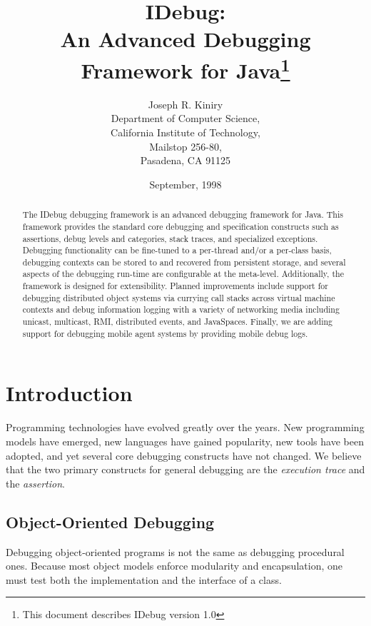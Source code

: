 \documentclass{article}
\title{IDebug:\\An Advanced Debugging Framework for Java\thanks{This
document describes IDebug version 1.0}}
\author{Joseph R. Kiniry\\
  Department of Computer Science,\\
  California Institute of Technology,\\
  Mailstop 256-80,\\
  Pasadena, CA 91125}
\date{September, 1998}
\begin{document}
\maketitle

\begin{abstract}
  
  The IDebug debugging framework is an advanced debugging framework for
  Java.  This framework provides the standard core debugging and
  specification constructs such as assertions, debug levels and categories,
  stack traces, and specialized exceptions.  Debugging functionality can be
  fine-tuned to a per-thread and/or a per-class basis, debugging contexts
  can be stored to and recovered from persistent storage, and several
  aspects of the debugging run-time are configurable at the meta-level.
  Additionally, the framework is designed for extensibility.  Planned
  improvements include support for debugging distributed object systems via
  currying call stacks across virtual machine contexts and debug
  information logging with a variety of networking media including unicast,
  multicast, RMI, distributed events, and JavaSpaces. Finally, we are
  adding support for debugging mobile agent systems by providing mobile
  debug logs.

\end{abstract}

\section{Introduction}

Programming technologies have evolved greatly over the years. New
programming models have emerged, new languages have gained popularity,
new tools have been adopted, and yet several core debugging constructs
have not changed.  We believe that the two primary constructs for
general debugging are the \emph{execution trace} and the
\emph{assertion}.

\subsection{Object-Oriented Debugging}

Debugging object-oriented programs is not the same as debugging
procedural ones.  Because most object models enforce modularity and
encapsulation, one must test both the implementation and the interface
of a class.
\end{document}
